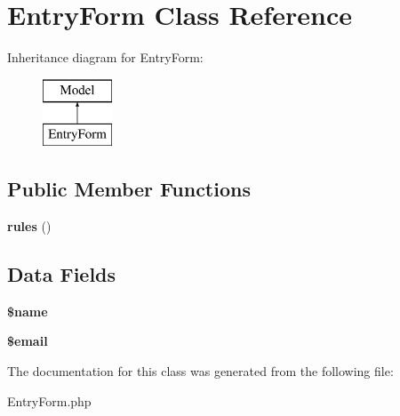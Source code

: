 \hypertarget{classapp_1_1models_1_1_entry_form}{}\section{Entry\+Form Class Reference}
\label{classapp_1_1models_1_1_entry_form}
Inheritance diagram for Entry\+Form\+:\begin{figure}[H]
\begin{center}
\leavevmode
\includegraphics[height=2.000000cm]{classapp_1_1models_1_1_entry_form}
\end{center}
\end{figure}
\subsection*{Public Member Functions}
\begin{DoxyCompactItemize}
\item 
\hypertarget{classapp_1_1models_1_1_entry_form_a17dba92d96b9dd48c62f3ede3eef94d4}{}\label{classapp_1_1models_1_1_entry_form_a17dba92d96b9dd48c62f3ede3eef94d4} 
{\bfseries rules} ()
\end{DoxyCompactItemize}
\subsection*{Data Fields}
\begin{DoxyCompactItemize}
\item 
\hypertarget{classapp_1_1models_1_1_entry_form_ab2fc40d43824ea3e1ce5d86dee0d763b}{}\label{classapp_1_1models_1_1_entry_form_ab2fc40d43824ea3e1ce5d86dee0d763b} 
{\bfseries \$name}
\item 
\hypertarget{classapp_1_1models_1_1_entry_form_ad634f418b20382e2802f80532d76d3cd}{}\label{classapp_1_1models_1_1_entry_form_ad634f418b20382e2802f80532d76d3cd} 
{\bfseries \$email}
\end{DoxyCompactItemize}


The documentation for this class was generated from the following file\+:\begin{DoxyCompactItemize}
\item 
Entry\+Form.\+php\end{DoxyCompactItemize}
